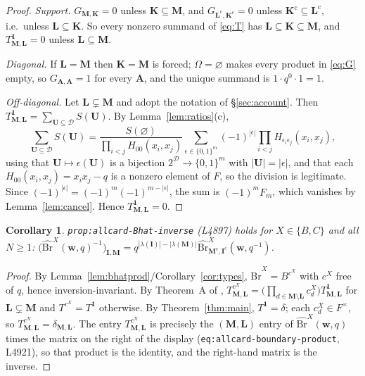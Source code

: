 \documentclass[11pt]{article}
\theoremstyle{plain}
\newtheorem{cor}[thm]{Corollary}
\theoremstyle{definition}
\theoremstyle{remark}
\newcommand{\bM}{\mathbf M}
\newcommand{\bK}{\mathbf K}
\newcommand{\bL}{\mathbf L}
\newcommand{\bI}{\mathbf I}
\newcommand{\bU}{\mathbf U}
\newcommand{\bA}{\mathbf A}
\newcommand{\bw}{\mathbf w}
\newcommand{\cD}{\mathcal D}
\newcommand{\cm}{{\mathrm c}}
\newcommand{\Bh}{\widehat{\mathrm{Br}}}
\newcommand{\Om}{\Omega}
\begin{document}
\begin{proof}
\emph{Support.} $G_{\bM,\bK}=0$ unless $\bK\subseteq\bM$, and
$G_{\bL^\cm,\bK^\cm}=0$ unless $\bK^\cm\subseteq\bL^\cm$, i.e.\ unless
$\bL\subseteq\bK$. So every nonzero summand of \eqref{eq:T} has
$\bL\subseteq\bK\subseteq\bM$, and $T^{\mathbf 1}_{\bM,\bL}=0$ unless
$\bL\subseteq\bM$.

\emph{Diagonal.} If $\bL=\bM$ then $\bK=\bM$ is forced; $\Om=\varnothing$ makes
every product in \eqref{eq:G} empty, so $G_{\bA,\bA}=1$ for every $\bA$, and the
unique summand is $1\cdot q^0\cdot1=1$.

\emph{Off-diagonal.} Let $\bL\subsetneq\bM$ and adopt the notation of
\S\ref{sec:account}. Then $T^{\mathbf 1}_{\bM,\bL}=\sum_{\bU\subseteq\cD}S(\bU)$.
By Lemma~\ref{lem:ratios}(c),
\[
\sum_{\bU\subseteq\cD}S(\bU)
=\frac{S(\varnothing)}{\prod_{i<j}H_{00}(x_i,x_j)}
\sum_{\epsilon\in\{0,1\}^m}(-1)^{|\epsilon|}
\prod_{i<j}H_{\epsilon_i\epsilon_j}(x_i,x_j),
\]
using that $\bU\mapsto\epsilon(\bU)$ is a bijection $2^{\cD}\to\{0,1\}^m$ with
$|\bU|=|\epsilon|$, and that each $H_{00}(x_i,x_j)=x_ix_j-q$ is a nonzero element
of $F$, so the division is legitimate. Since
$(-1)^{|\epsilon|}=(-1)^m(-1)^{m-|\epsilon|}$, the sum is $(-1)^mF_m$, which
vanishes by Lemma~\ref{lem:cancel}. Hence $T^{\mathbf 1}_{\bM,\bL}=0$.
\end{proof}

\begin{cor}
\label{cor:prop}
\texttt{prop:allcard-Bhat-inverse} \textup{(L4897)} holds for $X\in\{B,C\}$ and all
$N\ge1$:
$\bigl(\Bh^X(\bw,q)^{-1}\bigr)_{\bI,\bM}
=q^{|\lambda(\bI)|-|\lambda(\bM)|}\Bh^X_{\bM^\cm,\bI^\cm}(\bw,q^{-1})$.
\end{cor}

\begin{proof}
By Lemma~\ref{lem:bhatprod}/Corollary~\ref{cor:types}, $\Bh^X=B^{c^X}$ with $c^X$
free of $q$, hence inversion-invariant. By Theorem~A of \cite{ClioA},
$T^{c^X}_{\bM,\bL}=\bigl(\prod_{d\in\bM\setminus\bL}c^X_d\bigr)T^{\mathbf 1}_{\bM,\bL}$
for $\bL\subsetneq\bM$ and $T^{c^X}=T^{\mathbf 1}$ otherwise. By
Theorem~\ref{thm:main}, $T^{\mathbf 1}=\delta$; each $c^X_d\in F^\times$, so
$T^{c^X}_{\bM,\bL}=\delta_{\bM,\bL}$. The entry $T^{c^X}_{\bM,\bL}$ is precisely
the $(\bM,\bL)$ entry of $\Bh^X(\bw,q)$ times the matrix on the right of the
display (\texttt{eq:allcard-boundary-product}, L4921), so that product is the
identity, and the right-hand matrix is the inverse.
\end{proof}
\end{document}
